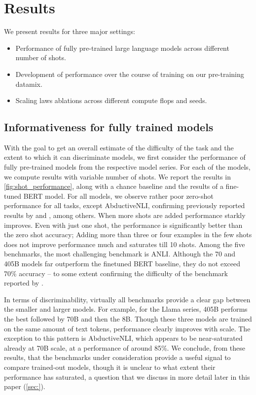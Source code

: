 \section{Results}



We present results for three major settings:
\begin{itemize}
    \item Performance of fully pre-trained large language models across different number of shots.
    \item Development of performance over the course of training on our pre-training datamix.
    \item Scaling laws ablations across different compute flops and seeds.
\end{itemize}

\subsection{Informativeness for fully trained models}

With the goal to get an overall estimate of the difficulty of the task and the extent to which it can discriminate models, we first consider the performance of fully pre-trained models from the respective model series.
For each of the models, we compute results with variable number of shots.
We report the results in \cref{fig:shot_performance}, along with a chance baseline and the results of a fine-tuned BERT model.
For all models, we observe rather poor zero-shot performance for all tasks, except AbductiveNLI, confirming previously reported results by \citet{ohmer2024form} and \citet{weber-etal-2023-mind}, among others.
When more shots are added performance starkly improves.
Even with just one shot, the performance is significantly better than the zero shot accuracy; Adding more than three or four examples in the few shots does not improve performance much and saturates till 10 shots. 
Among the five benchmarks, the most challenging benchmark is ANLI.
Although the 70 and 405B models far outperform the finetuned BERT baseline, they do not exceed 70\% accuracy -- to some extent confirming the difficulty of the benchmark reported by \citet{brown2020language}.

In terms of discriminability, virtually all benchmarks provide a clear gap between the smaller and larger models.
For example, for the Llama series, 405B performs the best followed by 70B and then the 8B. 
Though these three models are trained on the same amount of text tokens, performance clearly improves with scale. 
The exception to this pattern is AbductiveNLI, which appears to be near-saturated already at 70B scale, at a performance of around 85\%.
We conclude, from these results, that the benchmarks under consideration provide a useful signal to compare trained-out models, though it is unclear to what extent their performance has saturated, a question that we discuss in more detail later in this paper (\cref{sec:}).

